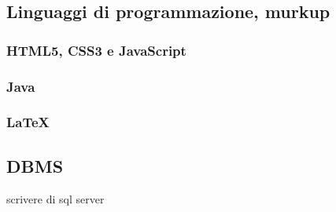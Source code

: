 \subsection{Linguaggi di programmazione, murkup}

\subsubsection{HTML5, CSS3 e JavaScript}

\subsubsection{Java}

\subsubsection{\LaTeX{}}

\subsection{DBMS}
scrivere di sql server



